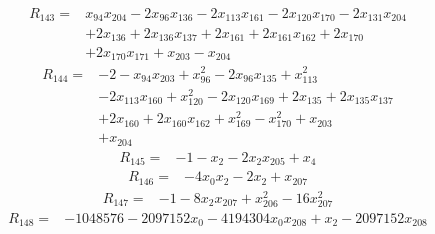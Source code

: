 \begin{align*} R_{143}={}&x_{94}x_{204} -2 x_{96}x_{136} -2 x_{113}x_{161} -2 x_{120}x_{170} -2 x_{131}x_{204}
\\ &+2 x_{136} +2 x_{136}x_{137} +2 x_{161} +2 x_{161}x_{162} +2 x_{170}
\\ &+2 x_{170}x_{171} +x_{203} -x_{204}
\end{align*}
\begin{align*} R_{144}={}&-2 -x_{94}x_{203} +x_{96}^{2} -2 x_{96}x_{135} +x_{113}^{2}
\\ &-2 x_{113}x_{160} +x_{120}^{2} -2 x_{120}x_{169} +2 x_{135} +2 x_{135}x_{137}
\\ &+2 x_{160} +2 x_{160}x_{162} +x_{169}^{2} -x_{170}^{2} +x_{203}
\\ &+x_{204}
\end{align*}
\begin{align*} R_{145}={}&-1 -x_{2} -2 x_{2}x_{205} +x_{4}
\end{align*}
\begin{align*} R_{146}={}&-4 x_{0}x_{2} -2 x_{2} +x_{207}
\end{align*}
\begin{align*} R_{147}={}&-1 -8 x_{2}x_{207} +x_{206}^{2} -16 x_{207}^{2}
\end{align*}
\begin{align*} R_{148}={}&-1048576 -2097152 x_{0} -4194304 x_{0}x_{208} +x_{2} -2097152 x_{208}
\end{align*}
